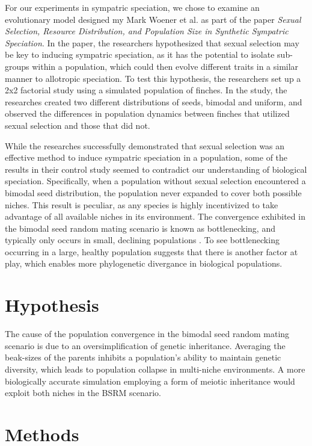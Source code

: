 \documentclass{article}
\begin{document}
For our experiments in sympatric speciation, we chose to examine an evolutionary model designed my Mark Woener et al. as part of the paper \textit{Sexual Selection, Resource Distribution, and Population Size in Synthetic Sympatric Speciation}. In the paper, the researchers hypothesized that sexual selection may be key to inducing sympatric speciation, as it has the potential to isolate sub-groups within a population, which could then evolve different traits in a similar manner to allotropic speciation. To test this hypothesis, the researchers set up a 2x2 factorial study using a simulated population of finches. In the study, the researches created two different distributions of seeds, bimodal and uniform, and observed the differences in population dynamics between finches that utilized sexual selection and those that did not.

While the researches successfully demonstrated that sexual selection was an effective method to induce sympatric speciation in a population, some of the results in their control study seemed to contradict our understanding of biological speciation. Specifically, when a population without sexual selection encountered a bimodal seed distribution, the population never expanded to cover both possible niches. This result is peculiar, as any species is highly incentivized to take advantage of all available niches in its environment. The convergence exhibited in the bimodal seed random mating scenario is known as bottlenecking, and typically only occurs in small, declining populations \cite{CHICKEN}. To see bottlenecking occurring in a large, healthy population suggests that there is another factor at play, which enables more phylogenetic divergance in biological populations.



\section{Hypothesis}

The cause of the population convergence in the bimodal seed random mating scenario is due to an oversimplification of genetic inheritance. Averaging the beak-sizes of the parents inhibits a population’s ability to maintain genetic diversity, which leads to population collapse in multi-niche environments. A more biologically accurate simulation employing a form of meiotic inheritance would exploit both niches in the BSRM scenario.



\section{Methods}
\end{document}
